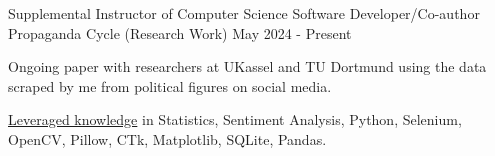 \begin{cventries}
\cventryalt
    {Supplemental Instructor of Computer Science} %
    { Software Developer/Co-author} %
    { Propaganda Cycle (Research Work) } %
    { May 2024 - Present } %
    {
      \begin{cvitems}
      \item {Ongoing paper with researchers at UKassel and TU Dortmund using the data scraped by me from political figures on social media.}
      \item {\underline{Leveraged knowledge} in Statistics, Sentiment Analysis, Python, Selenium, OpenCV, Pillow, CTk, Matplotlib, SQLite, Pandas.}
      \end{cvitems}
    }


\end{cventries}
